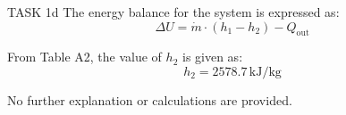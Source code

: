 TASK 1d  
The energy balance for the system is expressed as:  
\[
\Delta U = \dot{m} \cdot (h_1 - h_2) - Q_{\text{out}}
\]  

From Table A2, the value of \( h_2 \) is given as:  
\[
h_2 = 2578.7 \, \text{kJ/kg}
\]  

No further explanation or calculations are provided.